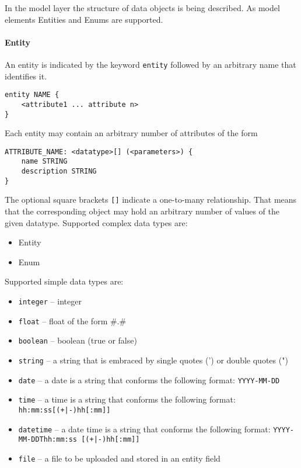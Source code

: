 
In the model layer the structure of data objects is being described. As model elements Entities and Enums are supported.
\paragraph{Entity}
An entity is indicated by the keyword {\lstinline!entity!} followed by an arbitrary name that identifies it.
\begin{lstlisting}
entity NAME {
	<attribute1 ... attribute n>
}
\end{lstlisting}
Each entity may contain an arbitrary number of attributes of the form
\begin{lstlisting}
ATTRIBUTE_NAME: <datatype>[] (<parameters>) {
	name STRING
	description STRING
}
\end{lstlisting}
The optional square brackets \lstinline|[]| indicate a one-to-many relationship. That means that the corresponding object may hold an arbitrary number of values of the given datatype.
Supported complex data types are:
\begin{itemize}
\item{Entity}
\item{Enum}
\end{itemize}
Supported simple data types are:

\begin{itemize}
\item{\lstinline!integer! -- integer}
\item{\lstinline!float! -- float of the form \#.\#}
\item{\lstinline!boolean! -- boolean (\ie true or false)}
\item{\lstinline!string! -- a string that is embraced by single quotes (') or double quotes (")}
\item{\lstinline!date! -- a date is a string that conforms the following format: \lstinline!YYYY-MM-DD!}
\item{\lstinline!time! -- a time is a string that conforms the following format: \lstinline!hh:mm:ss[(+|-)hh[:mm]]!}
\item{\lstinline!datetime! -- a date time is a string that conforms the following format: \lstinline!YYYY-MM-DDThh:mm:ss [(+|-)hh[:mm]]!}
\item{\lstinline!file! -- a file to be uploaded and stored in an entity field}
\end{itemize}

